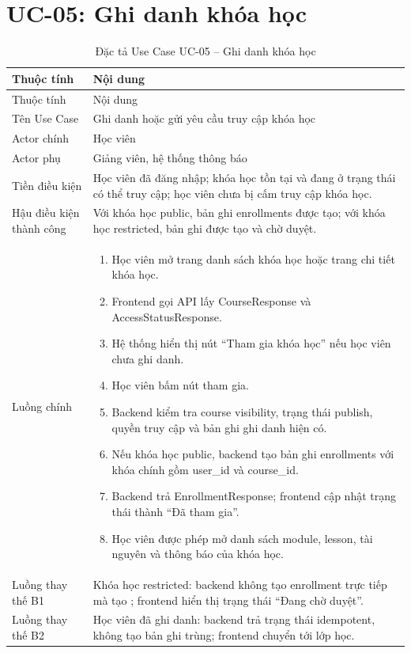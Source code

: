 \documentclass[12pt,a4paper]{report}
\begin{document}
\section{UC-05: Ghi danh khóa học}
\begin{longtable}{L{4cm} L{10.5cm}}
\caption{Đặc tả Use Case UC-05 -- Ghi danh khóa học}\label{tab:uc-enroll}\\
\toprule
Thuộc tính & Nội dung \\
\midrule
\endfirsthead
\toprule
Thuộc tính & Nội dung \\
\midrule
\endhead
Tên Use Case & Ghi danh hoặc gửi yêu cầu truy cập khóa học \\
Actor chính & Học viên \\
Actor phụ & Giảng viên, hệ thống thông báo \\
Tiền điều kiện & Học viên đã đăng nhập; khóa học tồn tại và đang ở trạng thái có thể truy cập; học viên chưa bị cấm truy cập khóa học. \\
Hậu điều kiện thành công & Với khóa học public, bản ghi enrollments được tạo; với khóa học restricted, bản ghi  được tạo và chờ duyệt. \\
Luồng chính & \begin{enumerate}[leftmargin=*]
\item Học viên mở trang danh sách khóa học hoặc trang chi tiết khóa học.
\item Frontend gọi API lấy CourseResponse và AccessStatusResponse.
\item Hệ thống hiển thị nút ``Tham gia khóa học'' nếu học viên chưa ghi danh.
\item Học viên bấm nút tham gia.
\item Backend kiểm tra course visibility, trạng thái publish, quyền truy cập và bản ghi ghi danh hiện có.
\item Nếu khóa học public, backend tạo bản ghi enrollments với khóa chính gồm user\_id và course\_id.
\item Backend trả EnrollmentResponse; frontend cập nhật trạng thái thành ``Đã tham gia''.
\item Học viên được phép mở danh sách module, lesson, tài nguyên và thông báo của khóa học.
\end{enumerate} \\
Luồng thay thế B1 & Khóa học restricted: backend không tạo enrollment trực tiếp mà tạo ; frontend hiển thị trạng thái ``Đang chờ duyệt''. \\
Luồng thay thế B2 & Học viên đã ghi danh: backend trả trạng thái idempotent, không tạo bản ghi trùng; frontend chuyển tới lớp học. \\

\end{longtable}
\end{document}
